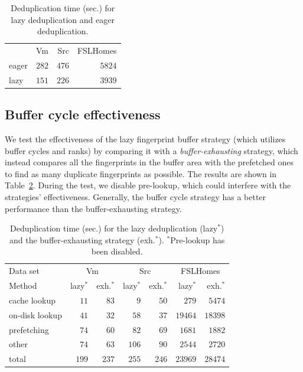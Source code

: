 \documentclass[prodmode,acmtecs]{acmsmall}
\begin{document}
\begin{table}[htp]
\centering
\begin{tabular}{lrrr}
\toprule
 & Vm & Src & FSLHomes \\
\cmidrule(lr){2-2}\cmidrule(lr){3-3}\cmidrule(lr){4-4}
eager & $282$ & $476$ & $5824$ \\
lazy  & $151$ & $226$ & $3939$ \\
\bottomrule
\end{tabular}
\caption{Deduplication time (sec.) for lazy deduplication and eager deduplication.}
\label{tab:dedup-time}
\end{table}


\subsection{Buffer cycle effectiveness}

We test the effectiveness of the lazy fingerprint buffer strategy (which utilizes buffer cycles and ranks) by comparing it with a \emph{buffer-exhausting} strategy, which instead compares all the fingerprints in the buffer area with the prefetched ones to find as many duplicate fingerprints as possible.  The results are shown in Table~\ref{tab:list-lookup-result}.  During the test, we disable pre-lookup, which could interfere with the strategies' effectiveness.  Generally, the buffer cycle strategy has a better performance than the buffer-exhausting strategy.

\begin{table}[htp]
\centering
\begin{tabular}{lrrrrrr}
\toprule
Data set & \multicolumn{2}{c}{Vm} & \multicolumn{2}{c}{Src} & \multicolumn{2}{c}{FSLHomes} \\
\cmidrule(lr){2-3} \cmidrule(lr){4-5} \cmidrule(lr){6-7}
Method & lazy$^*$ & exh.$^*$ & lazy$^*$ & exh.$^*$ & lazy$^*$ & exh.$^*$ \\
\midrule
cache lookup & $11$ & $83$ & $9$ & $50$ & $279$ & $5474$ \\
on-disk lookup & $41$ & $32$ & $58$ & $37$ & $19464$ & $18398$ \\
prefetching & $74$ & $60$ & $82$ & $69$ & $1681$ & $1882$ \\
other & $74$ & $63$ & $106$ & $90$ & $2544$ & $2720$ \\
\midrule
total & $199$ & $237$ & $255$ & $246$ & $23969$ & $28474$ \\
\bottomrule
\end{tabular}
\caption{Deduplication time (sec.) for the lazy deduplication (lazy$^*$) and the buffer-exhausting strategy (exh.$^*$). $^*$Pre-lookup has been disabled.}
\label{tab:list-lookup-result}
\end{table}
\end{document}
